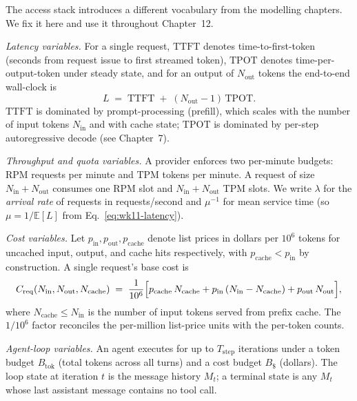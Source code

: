 \begin{notationbox}
The access stack introduces a different vocabulary from the
modelling chapters. We fix it here and use it throughout
Chapter~12.

\textit{Latency variables.} For a single request,
$\mathrm{TTFT}$ denotes time-to-first-token (seconds from request
issue to first streamed token), $\mathrm{TPOT}$ denotes
time-per-output-token under steady state, and for an output of
$N_\mathrm{out}$ tokens the end-to-end wall-clock is
\begin{equation}
  L \;=\; \mathrm{TTFT} \;+\; (N_\mathrm{out} - 1)\,\mathrm{TPOT}.
  \label{eq:wk11-latency}
\end{equation}
$\mathrm{TTFT}$ is dominated by prompt-processing (prefill), which
scales with the number of input tokens $N_\mathrm{in}$ and with
cache state; $\mathrm{TPOT}$ is dominated by per-step autoregressive
decode (see Chapter~7).

\textit{Throughput and quota variables.} A provider enforces two
per-minute budgets: $\mathrm{RPM}$ requests per minute and
$\mathrm{TPM}$ tokens per minute. A request of size
$N_\mathrm{in} + N_\mathrm{out}$ consumes one RPM slot and
$N_\mathrm{in} + N_\mathrm{out}$ TPM slots. We write $\lambda$ for
the \emph{arrival rate} of requests in requests/second and
$\mu^{-1}$ for mean service time (so $\mu = 1/\mathbb{E}[L]$ from
Eq.~\eqref{eq:wk11-latency}).

\textit{Cost variables.} Let $p_\mathrm{in}, p_\mathrm{out},
p_\mathrm{cache}$ denote list prices in dollars per $10^6$ tokens
for uncached input, output, and cache hits respectively,
with $p_\mathrm{cache} < p_\mathrm{in}$ by construction. A single
request's base cost is
\begin{equation}
  C_\mathrm{req}(N_\mathrm{in}, N_\mathrm{out}, N_\mathrm{cache})
  \;=\; \frac{1}{10^{6}}\Bigl[
        p_\mathrm{cache}\,N_\mathrm{cache}
        + p_\mathrm{in}\,(N_\mathrm{in} - N_\mathrm{cache})
        + p_\mathrm{out}\,N_\mathrm{out}\Bigr],
  \label{eq:wk11-cost}
\end{equation}
where $N_\mathrm{cache} \le N_\mathrm{in}$ is the number of input
tokens served from prefix cache. The $1/10^{6}$ factor reconciles
the per-million list-price units with the per-token counts.

\textit{Agent-loop variables.} An agent executes for up to
$T_\mathrm{step}$ iterations under a token budget
$B_\mathrm{tok}$ (total tokens across all turns) and a cost budget
$B_\${}$ (dollars). The loop state at iteration $t$ is the message
history $M_t$; a terminal state is any $M_t$ whose last assistant
message contains no tool call.


\end{notationbox}
